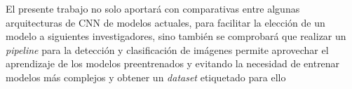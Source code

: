 El presente trabajo no solo aportará con comparativas entre algunas arquitecturas de CNN de modelos actuales, para facilitar la elección de un modelo a siguientes investigadores, sino también se comprobará que realizar un \textit{pipeline} para la detección y clasificación de imágenes permite aprovechar el aprendizaje de los modelos preentrenados y evitando la necesidad de entrenar modelos más complejos y obtener un \textit{dataset} etiquetado para ello